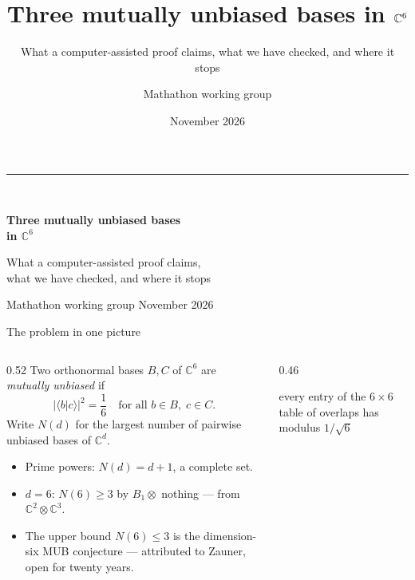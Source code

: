 \documentclass[aspectratio=169,10pt]{beamer}
\title{\bfseries Three mutually unbiased bases in $\C^6$}
\subtitle{What a computer-assisted proof claims, what we have checked, and where it stops}
\author{Mathathon working group}
\date{November 2026}
\newcommand{\C}{\mathbb{C}}
\newcommand{\ip}[2]{\langle #1|#2\rangle}
\begin{document}
\begin{frame}[plain]
  \vspace*{6mm}
  {\color{acc}\rule{28mm}{2.2pt}}\\[5mm]
  {\huge\bfseries Three mutually unbiased bases\\[1mm] in $\C^6$\par}
  \vspace{4mm}
  {\large What a computer-assisted proof claims,\\ what we have checked, and where it stops\par}
  \vfill
  {\small Mathathon working group \hfill November 2026\par}
\end{frame}

\begin{frame}{The problem in one picture}
  \begin{columns}[T]
  \begin{column}{0.52\textwidth}
    Two orthonormal bases $B,C$ of $\C^6$ are \emph{mutually unbiased} if
    \[
      \bigl|\ip{b}{c}\bigr|^2=\frac16
      \quad\text{for all } b\in B,\; c\in C .
    \]
    Write $N(d)$ for the largest number of pairwise unbiased bases of $\C^d$.
    \medskip

    \begin{itemize}
      \item Prime powers: $N(d)=d+1$, a complete set.
      \item $d=6$: $N(6)\ge 3$ by $B_1\otimes$ nothing --- from $\C^2\otimes\C^3$.
      \item The upper bound $N(6)\le 3$ is the dimension-six MUB conjecture --- attributed to
            Zauner, open for twenty years.
    \end{itemize}
  \end{column}
  \begin{column}{0.46\textwidth}
    \centering

    \vspace{4mm}
    {\small\color{ink!70} every entry of the $6\times6$ table of overlaps has modulus $1/\sqrt6$}
  \end{column}
  \end{columns}
\end{frame}
\end{document}
